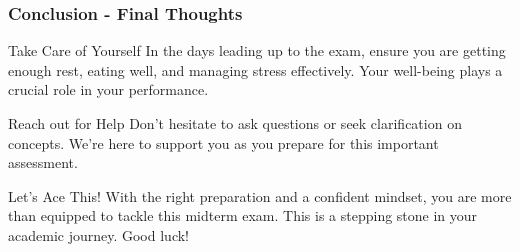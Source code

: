 \documentclass[aspectratio=169]{beamer}
\begin{document}
\begin{frame}[fragile]
    \frametitle{Conclusion - Final Thoughts}
    \begin{block}{Take Care of Yourself}
        In the days leading up to the exam, ensure you are getting enough rest, eating well, and managing stress effectively. Your well-being plays a crucial role in your performance.
    \end{block}
    
    \begin{block}{Reach out for Help}
        Don't hesitate to ask questions or seek clarification on concepts. We're here to support you as you prepare for this important assessment.
    \end{block}

    \begin{block}{Let’s Ace This!}
        With the right preparation and a confident mindset, you are more than equipped to tackle this midterm exam. This is a stepping stone in your academic journey. Good luck!
    \end{block}
\end{frame}
\end{document}
